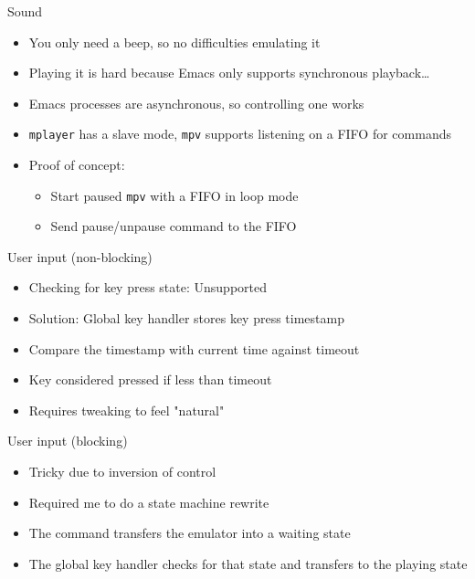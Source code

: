 \documentclass[presentation]{beamer}
\begin{document}
\begin{frame}[fragile,label={sec:orgb599a7a}]{Sound}
 \begin{itemize}
\item You only need a beep, so no difficulties emulating it
\item Playing it is hard because Emacs only supports synchronous
playback\ldots{}
\item Emacs processes are asynchronous, so controlling one works
\item \texttt{mplayer} has a slave mode, \texttt{mpv} supports listening on a FIFO for commands
\item Proof of concept:
\begin{itemize}
\item Start paused \texttt{mpv} with a FIFO in loop mode
\item Send pause/unpause command to the FIFO
\end{itemize}
\end{itemize}
\end{frame}

\begin{frame}[label={sec:org5cda192}]{User input (non-blocking)}
\begin{itemize}
\item Checking for key press state: Unsupported
\item Solution: Global key handler stores key press timestamp
\item Compare the timestamp with current time against timeout
\item Key considered pressed if less than timeout
\item Requires tweaking to feel "natural"
\end{itemize}
\end{frame}

\begin{frame}[label={sec:org17f6fd4}]{User input (blocking)}
\begin{itemize}
\item Tricky due to inversion of control
\item Required me to do a state machine rewrite
\item The command transfers the emulator into a waiting state
\item The global key handler checks for that state and transfers to the
playing state
\end{itemize}
\end{frame}
\end{document}
